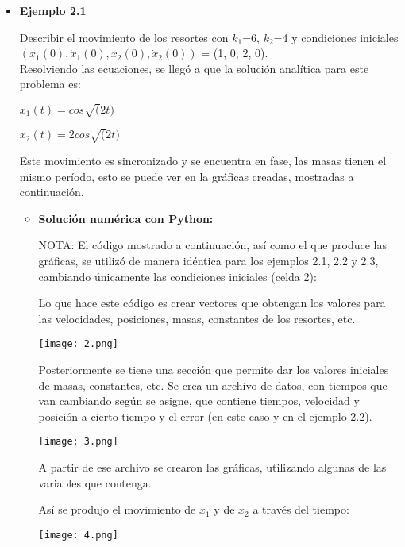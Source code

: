 \documentclass[12pt]{article}
\begin{document}
\begin{itemize}
\item \textbf{Ejemplo 2.1}

Describir el movimiento de los resortes con $k_1$=6, $k_2$=4 y condiciones iniciales $(x_1(0), \dot x_1(0), x_2(0), \dot x_2(0))$ = (1, 0, 2, 0).\\

Resolviendo las ecuaciones, se llegó a que la solución analítica para este problema es: \\

\centerline{$x_1(t) = cos\sqrt (2t)$}
\centerline{$x_2(t) = 2cos\sqrt (2t)$}

Este movimiento es sincronizado y se encuentra en fase, las masas tienen el mismo período, esto se puede ver en la gráficas creadas, mostradas a continuación. 

\begin{itemize}
\item \textbf{Solución numérica con Python:}

NOTA: El código mostrado a continuación, así como el que produce las gráficas, se utilizó de manera idéntica para los ejemplos 2.1, 2.2 y 2.3, cambiando únicamente las condiciones iniciales (celda 2):

Lo que hace este código es crear vectores que obtengan los valores para las velocidades, posiciones, masas, constantes de los resortes, etc.

\begin{center}
        \texttt{[image: 2.png]}
\end{center}

Posteriormente se tiene una sección que permite dar los valores iniciales de masas, constantes, etc. Se crea un archivo de datos, con tiempos que van cambiando según se asigne, que contiene tiempos, velocidad y posición a cierto tiempo y el error (en este caso y en el ejemplo 2.2). 

\begin{center}
        \texttt{[image: 3.png]}
\end{center}


A partir de ese archivo se crearon las gráficas, utilizando algunas de las variables que contenga. 

\clearpage
Así se produjo el movimiento de $x_1$ y de $x_2$ a través del tiempo:

\begin{center}
        \texttt{[image: 4.png]}
\end{center}


\end{itemize}
\end{itemize}
\end{document}
